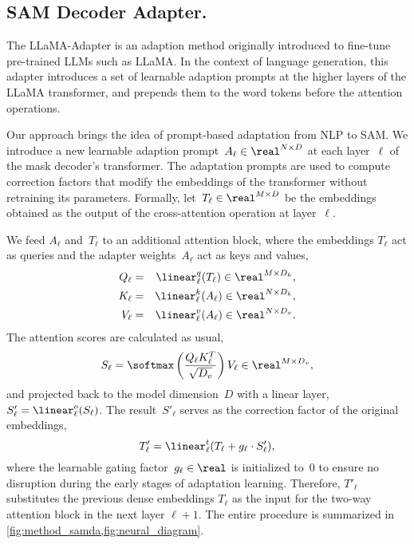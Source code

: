 \subsection{SAM Decoder Adapter.}
\label{sec:adapter}

The LLaMA-Adapter is an adaption method originally introduced to fine-tune pre-trained LLMs such as LLaMA. In the context of language generation, this adapter introduces a set of learnable adaption prompts at the higher layers of the LLaMA transformer, and prepends them to the word tokens before the attention operations. 

Our approach brings the idea of prompt-based adaptation from NLP to SAM. We introduce a new learnable adaption prompt~$A_\ell\in\real^{N\times{}D}$ at each layer~$\ell$ of the mask decoder's transformer. The adaptation prompts are used to compute correction factors that modify the embeddings of the transformer without retraining its parameters. Formally, let~$T_\ell\in\real^{M\times D}$ be the embeddings obtained as the output of the cross-attention operation at layer~$\ell$.

We feed $A_\ell$ and~$T_\ell$ to an additional attention block, where the embeddings $T_\ell$ act as queries and the adapter weights~$A_\ell$ act as keys and values,
\begin{eqnarray}
    Q_\ell & = & \linear^q_\ell(T_{\ell}) \in \real^{M\times D_k}, \\
    K_\ell & = & \linear^k_\ell(A_{\ell}) \in \real^{N\times D_k}, \\
    V_\ell & = & \linear^v_\ell(A_{\ell}) \in \real^{N\times D_v}.
\end{eqnarray}
The attention scores are calculated as usual,
\begin{equation}
    S_\ell = \softmax\left(\dfrac{Q_\ell{}K_\ell^T}{\sqrt{D_v}}\right)V_\ell \in \real^{M\times D_v},
\end{equation}
and projected back to the model dimension~$D$ with a linear layer, $S'_\ell=\linear^o_\ell(S_\ell)$. The result~$S'_\ell$ serves as the correction factor of the original embeddings,
\begin{equation}
    T'_\ell = \linear^t_\ell(T_\ell + g_\ell \cdot S'_\ell),
\end{equation}
where the learnable gating factor~$g_\ell\in\real$ is initialized to~0 to ensure no disruption during the early stages of adaptation learning. Therefore, $T'_\ell$ substitutes the previous dense embeddings $T_\ell$ as the input for the two-way attention block in the next layer $\ell + 1$. The entire procedure is summarized in \cref{fig:method_samda,fig:neural_diagram}.

